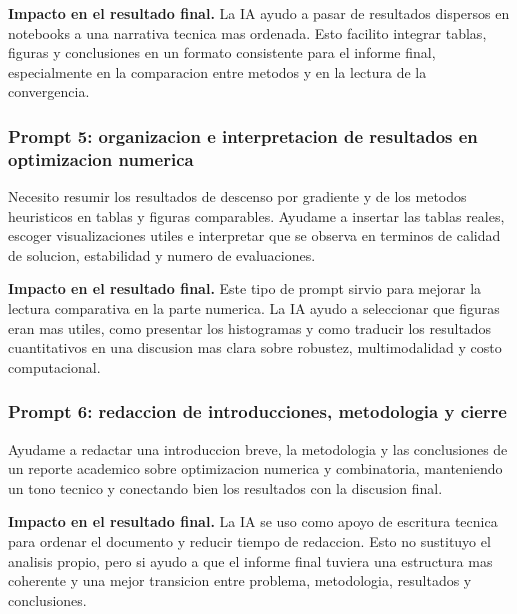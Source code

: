 \documentclass[
  12pt,
  letterpaper,
  DIV=11,
  numbers=noendperiod]{scrartcl}
\newenvironment{Shaded}{\begin{snugshade}}{\end{snugshade}}
\newcommand{\NormalTok}[1]{\textcolor[rgb]{0.00,0.23,0.31}{#1}}
\begin{document}
\textbf{Impacto en el resultado final.} La IA ayudo a pasar de
resultados dispersos en notebooks a una narrativa tecnica mas ordenada.
Esto facilito integrar tablas, figuras y conclusiones en un formato
consistente para el informe final, especialmente en la comparacion entre
metodos y en la lectura de la convergencia.

\subsubsection{Prompt 5: organizacion e interpretacion de resultados en
optimizacion
numerica}\label{prompt-5-organizacion-e-interpretacion-de-resultados-en-optimizacion-numerica}

\begin{Shaded}
\begin{Highlighting}[]
\NormalTok{Necesito resumir los resultados de descenso por gradiente y de los metodos heuristicos en tablas y figuras comparables. Ayudame a insertar las tablas reales, escoger visualizaciones utiles e interpretar que se observa en terminos de calidad de solucion, estabilidad y numero de evaluaciones.}
\end{Highlighting}
\end{Shaded}

\textbf{Impacto en el resultado final.} Este tipo de prompt sirvio para
mejorar la lectura comparativa en la parte numerica. La IA ayudo a
seleccionar que figuras eran mas utiles, como presentar los histogramas
y como traducir los resultados cuantitativos en una discusion mas clara
sobre robustez, multimodalidad y costo computacional.

\subsubsection{Prompt 6: redaccion de introducciones, metodologia y
cierre}\label{prompt-6-redaccion-de-introducciones-metodologia-y-cierre}

\begin{Shaded}
\begin{Highlighting}[]
\NormalTok{Ayudame a redactar una introduccion breve, la metodologia y las conclusiones de un reporte academico sobre optimizacion numerica y combinatoria, manteniendo un tono tecnico y conectando bien los resultados con la discusion final.}
\end{Highlighting}
\end{Shaded}

\textbf{Impacto en el resultado final.} La IA se uso como apoyo de
escritura tecnica para ordenar el documento y reducir tiempo de
redaccion. Esto no sustituyo el analisis propio, pero si ayudo a que el
informe final tuviera una estructura mas coherente y una mejor
transicion entre problema, metodologia, resultados y conclusiones.
\end{document}
